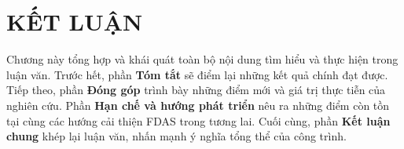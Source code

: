 
\chapter{KẾT LUẬN}

Chương này tổng hợp và khái quát toàn bộ nội dung tìm hiểu và thực hiện trong luận văn. 
Trước hết, phần \textbf{Tóm tắt} sẽ điểm lại những kết quả chính đạt được. 
Tiếp theo, phần \textbf{Đóng góp} trình bày những điểm mới và giá trị thực tiễn của nghiên cứu. 
Phần \textbf{Hạn chế và hướng phát triển} nêu ra những điểm còn tồn tại cùng các hướng cải thiện FDAS trong tương lai. 
Cuối cùng, phần \textbf{Kết luận chung} khép lại luận văn, nhấn mạnh ý nghĩa tổng thể của công trình. 





